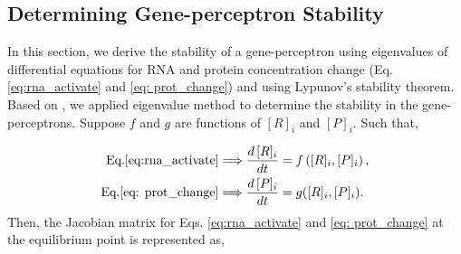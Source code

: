 \documentclass[twocolumn]{biophys-new}
\begin{document}
{{%
 


















\subsection*{Determining Gene-perceptron Stability} \label{append_B}
In this section,  we derive the stability of a gene-perceptron
using eigenvalues  of differential equations for RNA and protein concentration change (Eq. \ref{eq:rna_activate} and \ref{eq: prot_change}) 
and using Lypunov's stability theorem. Based on \cite{samaniego2021signaling}, we  applied eigenvalue method to determine the stability in  the gene-perceptrons. 
Suppose $f$ and $g$ are functions of $[R]_i$ and $[P]_i$. Such that, 

\vspace{-1em}
\begin{align}
    \text{Eq.} \ref{eq:rna_activate} \Longrightarrow \dfrac{d \,[R]_i}{dt} &= f \left( [R]_i, [P]_i  \right),\\
    \text{Eq.} \ref{eq: prot_change} \Longrightarrow \dfrac{d \, [P]_i}{dt} &=  g([R]_i,  [P]_i). \label{eq: define_function_jaco}
\end{align}
Then, the  Jacobian matrix for Eqs. \ref{eq:rna_activate} and \ref{eq: prot_change} at the equilibrium point is represented as, 

}}
\end{document}
